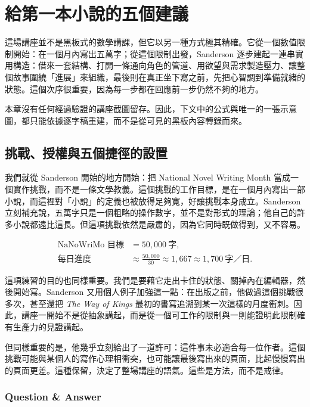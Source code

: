 \chapter{給第一本小說的五個建議}

這場講座並不是黑板式的數學講課，但它以另一種方式極其精確。它從一個數值限制開始：在一個月內寫出五萬字；從這個限制出發，Sanderson 逐步建起一連串實用構造：借來一套結構、打開一條通向角色的管道、用欲望與需求製造壓力、讓整個故事圍繞「進展」來組織，最後則在真正坐下寫之前，先把心智調到準備就緒的狀態。這個次序很重要，因為每一步都在回應前一步仍然不夠的地方。

\begin{remark}
本章沒有任何經過驗證的講座截圖留存。因此，下文中的公式與唯一的一張示意圖，都只能依據逐字稿重建，而不是從可見的黑板內容轉錄而來。
\end{remark}

\section{挑戰、授權與五個捷徑的設置}

我們就從 Sanderson 開始的地方開始：把 National Novel Writing Month 當成一個實作挑戰，而不是一條文學教義。這個挑戰的工作目標，是在一個月內寫出一部小說，而這裡對「小說」的定義也被放得足夠寬，好讓挑戰本身成立。Sanderson 立刻補充說，五萬字只是一個粗略的操作數字，並不是對形式的理論；他自己的許多小說都遠比這長。但這項挑戰依然是嚴肅的，因為它同時既做得到，又不容易。

\begin{align}
\text{NaNoWriMo 目標} &= 50{,}000\ \text{字},\\
\text{每日進度} &\approx \frac{50{,}000}{30} \approx 1{,}667 \approx 1{,}700\ \text{字／日}.
\end{align}

這項練習的目的也同樣重要。我們是要藉它走出卡住的狀態、關掉內在編輯器，然後開始寫。Sanderson 又用個人例子加強這一點：在出版之前，他做過這個挑戰很多次，甚至還把 \textit{The Way of Kings} 最初的書寫追溯到某一次這樣的月度衝刺。因此，講座一開始不是從抽象講起，而是從一個可工作的限制與一則能證明此限制確有生產力的見證講起。

但同樣重要的是，他幾乎立刻給出了一道許可：這件事未必適合每一位作者。這個挑戰可能與某個人的寫作心理相衝突，也可能讓最後寫出來的頁面，比起慢慢寫出的頁面更差。這種保留，決定了整場講座的語氣。這些是方法，而不是戒律。

\subsection{Question \& Answer}


